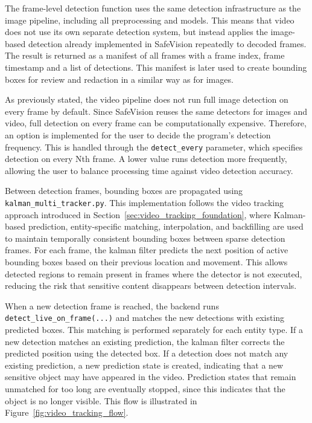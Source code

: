 The frame-level detection function uses the same detection infrastructure as the image pipeline, including all preprocessing and models. This means that video does not use its own separate detection system, but instead applies the image-based detection already implemented in \gls{SafeVision} repeatedly to decoded frames. The result is returned as a manifest of all frames with a frame index, frame timestamp and a list of detections. This manifest is later used to create \gls{bounding box}es for review and redaction in a similar way as for images.


As previously stated, the video pipeline does not run full image detection on every frame by default. Since \gls{SafeVision} reuses the same detectors for images and video, full detection on every frame can be computationally expensive. Therefore, an option is implemented for the user to decide the program's detection frequency. This is handled through the \texttt{detect\_every} parameter, which specifies detection on every Nth frame. A lower value runs detection more frequently, allowing the user to balance processing time against video detection accuracy.

Between detection frames, \gls{bounding box}es are propagated using \texttt{kalman\_multi\_tracker.py}. This implementation follows the video tracking approach introduced in Section~\ref{sec:video_tracking_foundation}, where Kalman-based prediction, entity-specific matching, interpolation, and backfilling are used to maintain temporally consistent \gls{bounding box}es between sparse detection frames. For each frame, the \gls{kalman filter} predicts the next position of active \gls{bounding box}es based on their previous location and movement. This allows detected regions to remain present in frames where the detector is not executed, reducing the risk that sensitive content disappears between detection intervals.

When a new detection frame is reached, the backend runs \texttt{detect\_live\_on\_frame(...)} and matches the new detections with existing predicted boxes. This matching is performed separately for each entity type. If a new detection matches an existing prediction, the \gls{kalman filter} corrects the predicted position using the detected box. If a detection does not match any existing prediction, a new prediction state is created, indicating that a new sensitive object may have appeared in the video. Prediction states that remain unmatched for too long are eventually stopped, since this indicates that the object is no longer visible. This flow is illustrated in Figure~\ref{fig:video_tracking_flow}.

